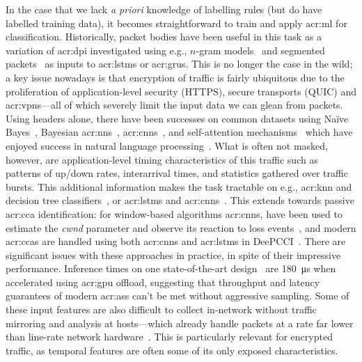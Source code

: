 In the case that we lack \emph{a priori} knowledge of labelling rules (but do have labelled training data), it becomes straightforward to train and apply \gls{acr:ml} for classification.
Historically, packet bodies have been useful in this task as a variation of \gls{acr:dpi} investigated using e.g., $n$-gram models~\parencite{DBLP:journals/ton/YunW0Z16} and segmented packets~\parencite{DBLP:conf/iwqos/LiXNZX18} as inputs to \glspl{acr:lstm} or \glspl{acr:gru}.
This is no longer the case in the wild; a key issue nowadays is that encryption of traffic is fairly ubiquitous due to the proliferation of application-level security (HTTPS), secure transports (QUIC) and \glspl{acr:vpn}---all of which severely limit the input data we can glean from packets.
Using headers alone, there have been successes on common datasets using Na\"{i}ve Bayes~\parencite{DBLP:conf/sigmetrics/MooreZ05}, Bayesian \glspl{acr:nn}~\parencite{DBLP:journals/tnn/AuldMG07}, \glspl{acr:cnn}~\parencite{DBLP:journals/soco/LotfollahiSZS20}, and self-attention mechanisms~\parencite{DBLP:conf/sigcomm/Xie0JDSLSX20} which have enjoyed success in natural language processing~\parencite{DBLP:conf/nips/VaswaniSPUJGKP17}.
What is often not masked, however, are application-level timing characteristics of this traffic such as patterns of up/down rates, interarrival times, and statistics gathered over traffic bursts.
This additional information makes the task tractable on e.g., \gls{acr:knn} and decision tree classifiers~\parencite{DBLP:conf/icissp/Draper-GilLMG16}, or \glspl{acr:lstm} and \glspl{acr:cnn}~\parencite{DBLP:journals/tnsm/AcetoCMP19}.
This extends towards passive \gls{acr:cca} identification: for window-based algorithms \glspl{acr:cnn}, have been used to estimate the \emph{cwnd} parameter and observe its reaction to loss events~\parencite{DBLP:conf/icccn/HagosEYK18}, and modern \glspl{acr:cca} are handled using both \glspl{acr:cnn} and \glspl{acr:lstm} in DeePCCI~\parencite{DBLP:conf/sigcomm/SanderRHW19}.
There are significant issues with these approaches in practice, in spite of their impressive performance.
Inference times on one state-of-the-art design~\parencite{DBLP:conf/sigcomm/Xie0JDSLSX20} are \qty{180}{\micro\second} when accelerated using \gls{acr:gpu} offload, suggesting that throughput and latency guarantees of modern \glspl{acr:as} can't be met without aggressive sampling.
Some of these input features are also difficult to collect in-network without traffic mirroring and analysis at hosts---which already handle packets at a rate far lower than line-rate network hardware~\parencite{DBLP:conf/sigcomm/GuptaHCFRW18}.
This is particularly relevant for encrypted traffic, as temporal features are often some of its only exposed characteristics.

